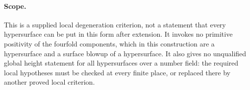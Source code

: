 \paragraph{Scope.}
This is a supplied local degeneration criterion, not a statement
that every hypersurface can be put in this form after extension.
It invokes no primitive positivity of the fourfold components,
which in this construction are a hypersurface and a surface
blowup of a hypersurface. It also gives no unqualified global
height statement for all hypersurfaces over a number field:
the required local hypotheses must be checked at every finite
place, or replaced there by another proved local criterion.
